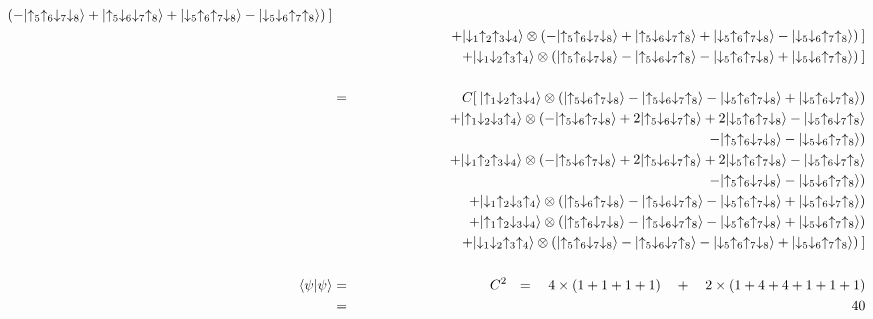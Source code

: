 \begin{eqnarray*}
			\left(-\ket{\up_5\up_6\dw_7\dw_8} + \ket{\up_5\dw_6\dw_7\up_8} +
			\ket{\dw_5\up_6\up_7\dw_8} - \ket{\dw_5\dw_6\up_7\up_8}\right)\:] \\
		&& \: + \ket{\dw_1\up_2\up_3\dw_4} \ox
			\left(-\ket{\up_5\up_6\dw_7\dw_8} + \ket{\up_5\dw_6\dw_7\up_8} +
			\ket{\dw_5\up_6\up_7\dw_8} - \ket{\dw_5\dw_6\up_7\up_8}\right)\:] \\
		&& \: + \ket{\dw_1\dw_2\up_3\up_4} \ox
			\left(\ket{\up_5\up_6\dw_7\dw_8} - \ket{\up_5\dw_6\dw_7\up_8} -
			\ket{\dw_5\up_6\up_7\dw_8} + \ket{\dw_5\dw_6\up_7\up_8}\right)\:] \\ \\			
	     &=& C[ \: \ket{\up_1\dw_2\up_3\dw_4} \ox 
	     		\left(\ket{\up_5\dw_6\up_7\dw_8} - \ket{\up_5\dw_6\dw_7\up_8} -
	              	\ket{\dw_5\up_6\up_7\dw_8} + \ket{\dw_5\up_6\dw_7\up_8}\right)  \\
		&& \: + \ket{\up_1\dw_2\dw_3\up_4} \ox
			(-\ket{\up_5\dw_6\up_7\dw_8} + 2\ket{\up_5\dw_6\dw_7\up_8} +
	             	 2\ket{\dw_5\up_6\up_7\dw_8} - \ket{\dw_5\up_6\dw_7\up_8} \\
		 && \hspace{3.5in}
		 	-\ket{\up_5\up_6\dw_7\dw_8} - \ket{\dw_5\dw_6\up_7\up_8}) \\
		&& \: + \ket{\dw_1\up_2\up_3\dw_4} \ox
			(-\ket{\up_5\dw_6\up_7\dw_8} + 2\ket{\up_5\dw_6\dw_7\up_8} +
	             	 2\ket{\dw_5\up_6\up_7\dw_8} - \ket{\dw_5\up_6\dw_7\up_8} \\
		 &&\hspace{3.5in}
		 	-\ket{\up_5\up_6\dw_7\dw_8} - \ket{\dw_5\dw_6\up_7\up_8}) \\
		&& \: + \ket{\dw_1\up_2\dw_3\up_4} \ox
			\left(\ket{\up_5\dw_6\up_7\dw_8} - \ket{\up_5\dw_6\dw_7\up_8} -
			\ket{\dw_5\up_6\up_7\dw_8} + \ket{\dw_5\up_6\dw_7\up_8}\right) \\
		&& \: + \ket{\up_1\up_2\dw_3\dw_4} \ox
			\left(\ket{\up_5\up_6\dw_7\dw_8} - \ket{\up_5\dw_6\dw_7\up_8} -
			\ket{\dw_5\up_6\up_7\dw_8} + \ket{\dw_5\dw_6\up_7\up_8}\right) \\
		&& \: + \ket{\dw_1\dw_2\up_3\up_4} \ox
			\left(\ket{\up_5\up_6\dw_7\dw_8} - \ket{\up_5\dw_6\dw_7\up_8} -
			\ket{\dw_5\up_6\up_7\dw_8} + \ket{\dw_5\dw_6\up_7\up_8}\right)\:] \\ \\
\bra{\psi} \psi \ra & = & C^2 \: \: \: = \quad 4 \times ( 1 + 1 + 1 + 1 ) \quad+  
								\quad 2 \times (1 + 4 + 4 + 1 + 1+ 1) \\
				& = & 40
\end{eqnarray*}
